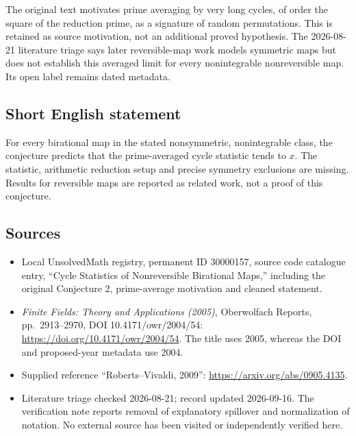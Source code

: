 \documentclass[11pt]{article}
\begin{document}
The original text motivates prime averaging by very long cycles, of order the square of the reduction prime, as a signature of random permutations. This is retained as source motivation, not an additional proved hypothesis. The 2026-08-21 literature triage says later reversible-map work models symmetric maps but does not establish this averaged limit for every nonintegrable nonreversible map. Its open label remains dated metadata.
\subsection{Short English statement}
For every birational map in the stated nonsymmetric, nonintegrable class, the conjecture predicts that the prime-averaged cycle statistic tends to \(x\). The statistic, arithmetic reduction setup and precise symmetry exclusions are missing. Results for reversible maps are reported as related work, not a proof of this conjecture.
\subsection{Sources}
\begin{itemize}
\item Local UnsolvedMath registry, permanent ID 30000157, source code catalogue entry, ``Cycle Statistics of Nonreversible Birational Maps,'' including the original Conjecture 2, prime-average motivation and cleaned statement.
\item \emph{Finite Fields: Theory and Applications (2005)}, Oberwolfach Reports, pp.\ 2913--2970, DOI 10.4171/owr/2004/54: \url{https://doi.org/10.4171/owr/2004/54}. The title uses 2005, whereas the DOI and proposed-year metadata use 2004.
\item Supplied reference ``Roberts--Vivaldi, 2009'': \url{https://arxiv.org/abs/0905.4135}.
\item Literature triage checked 2026-08-21; record updated 2026-09-16. The verification note reports removal of explanatory spillover and normalization of notation. No external source has been visited or independently verified here.
\end{itemize}
\end{document}

